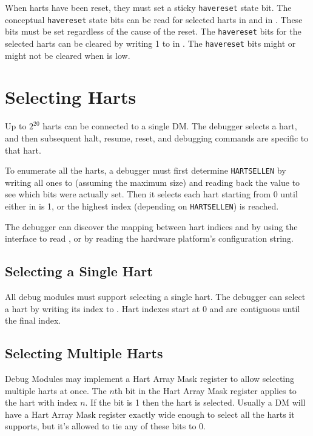 When harts have been reset, they must set a sticky {\tt havereset} state bit.
The conceptual {\tt havereset} state bits can be read for selected harts in
\FdmDmstatusAnyhavereset and \FdmDmstatusAllhavereset in \RdmDmstatus.
These bits must be set regardless of the cause of the reset.
The {\tt havereset} bits for the selected harts
can be cleared by writing 1 to \FdmDmcontrolAckhavereset in \RdmDmcontrol.
The {\tt havereset} bits might or might not be cleared
when \FdmDmcontrolDmactive is low.

\section{Selecting Harts} \label{selectingharts}

Up to $2^{20}$ harts can be connected to a single DM. The debugger
selects a hart, and then subsequent halt, resume, reset, and debugging
commands are specific to that hart.

To enumerate all the harts, a debugger must first determine {\tt HARTSELLEN}
by writing  all ones to \Fhartsel (assuming the maximum size) and reading back
the value to see which bits were actually set.  Then it selects each hart
starting from 0 until either \FdmDmstatusAnynonexistent in \RdmDmstatus is 1, or the
highest index (depending on {\tt HARTSELLEN}) is reached.

The debugger can discover the mapping between hart indices and
\Rmhartid by using the interface to read \Rmhartid, or by
reading the hardware platform's configuration string.

\subsection {Selecting a Single Hart}

All debug modules must support selecting a single hart.
The debugger can select a hart by writing its index to \Fhartsel.
Hart indexes start at 0 and are contiguous until the final index.

\subsection {Selecting Multiple Harts} \label{hartarraymask}

Debug Modules may implement a Hart Array Mask register to allow selecting
multiple harts at once. The $n$th bit in the Hart Array Mask register applies to
the hart with index $n$. If the bit is 1 then the hart is selected.  Usually a DM
will have a Hart Array Mask register exactly wide enough to select all the
harts it supports, but it's allowed to tie any of these bits to 0.

